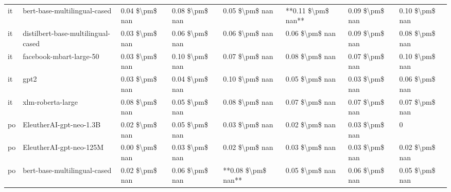 \begin{tabular}{llllllll}
      it &       bert-base-multilingual-cased & 0.04 \$\textbackslash pm\$ nan &            0.08 \$\textbackslash pm\$ nan &        0.05 \$\textbackslash pm\$ nan &     **0.11 \$\textbackslash pm\$ nan** &                          0.09 \$\textbackslash pm\$ nan &     0.10 \$\textbackslash pm\$ nan \\
      it & distilbert-base-multilingual-cased & 0.03 \$\textbackslash pm\$ nan &            0.06 \$\textbackslash pm\$ nan &        0.06 \$\textbackslash pm\$ nan &         0.06 \$\textbackslash pm\$ nan &                          0.09 \$\textbackslash pm\$ nan &     0.08 \$\textbackslash pm\$ nan \\
      it &            facebook-mbart-large-50 & 0.03 \$\textbackslash pm\$ nan &            0.10 \$\textbackslash pm\$ nan &        0.07 \$\textbackslash pm\$ nan &         0.08 \$\textbackslash pm\$ nan &                          0.07 \$\textbackslash pm\$ nan &     0.10 \$\textbackslash pm\$ nan \\
      it &                               gpt2 & 0.03 \$\textbackslash pm\$ nan &            0.04 \$\textbackslash pm\$ nan &        0.10 \$\textbackslash pm\$ nan &         0.05 \$\textbackslash pm\$ nan &                          0.03 \$\textbackslash pm\$ nan &     0.06 \$\textbackslash pm\$ nan \\
      it &                  xlm-roberta-large & 0.08 \$\textbackslash pm\$ nan &            0.05 \$\textbackslash pm\$ nan &        0.08 \$\textbackslash pm\$ nan &         0.07 \$\textbackslash pm\$ nan &                          0.07 \$\textbackslash pm\$ nan &     0.07 \$\textbackslash pm\$ nan \\
      po &            EleutherAI-gpt-neo-1.3B & 0.02 \$\textbackslash pm\$ nan &            0.05 \$\textbackslash pm\$ nan &        0.03 \$\textbackslash pm\$ nan &         0.02 \$\textbackslash pm\$ nan &                          0.03 \$\textbackslash pm\$ nan &                  0 \\
      po &            EleutherAI-gpt-neo-125M & 0.00 \$\textbackslash pm\$ nan &            0.03 \$\textbackslash pm\$ nan &        0.02 \$\textbackslash pm\$ nan &         0.03 \$\textbackslash pm\$ nan &                          0.03 \$\textbackslash pm\$ nan &     0.02 \$\textbackslash pm\$ nan \\
      po &       bert-base-multilingual-cased & 0.02 \$\textbackslash pm\$ nan &            0.06 \$\textbackslash pm\$ nan &    **0.08 \$\textbackslash pm\$ nan** &         0.05 \$\textbackslash pm\$ nan &                          0.06 \$\textbackslash pm\$ nan &     0.05 \$\textbackslash pm\$ nan \\

\end{tabular}
